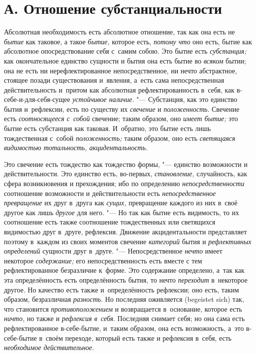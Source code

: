 \section[А. Отношение субстанциальности]{А. Отношение субстанциальности}

Абсолютная необходимость есть абсолютное
отношение, так как она есть не {\em бытие} как таковое,
а такое {\em бытие,} которое есть,
{\em потому что} оно есть, бытие как абсолютное
опосредствование себя с~самим собою. Это бытие есть
{\em субстанция;} как окончательное единство сущности и
бытия она есть бытие во {\em всяком} бытии; она не есть
ни нерефлектированное непосредственное, ни нечто абстрактное, стоящее
позади существования и~явления, а~есть сама непосредственная
действительность и~притом как абсолютная рефлектированность в~себя, как
в-себе-и-для-себя-сущее {\em устойчивое наличие}. "---
Субстанция, как это единство бытия и~рефлексии, есть по существу их
{\em свечение} и {\em положенность}. Свечение есть
{\em соотносящееся с~собой} свечение; таким образом,
оно {\em имеет бытие;} это бытие есть субстанция как
таковая. И~обратно, это бытие есть лишь тождественная с~собой
{\em положенность;} таким образом, оно есть
{\em светящаяся видимостью тотальность, акцидентальность.}

Это свечение есть тождество как тождество формы, "--- единство возможности и
действительности. Это единство есть, во-первых,
{\em становление,} случайность, как сфера возникновения
и прехождения; ибо по определению
{\em непосредственности} соотношение возможности и
действительности есть {\em непосредственное
превращение} их друг в~друга как {\em сущих,}
превращение каждого из них в~своё другое как лишь
{\em другое} для него. "--- Но так как бытие есть
видимость, то их соотношение есть также соотношение тождественных или
светящихся видимостью друг в~друге, рефлексия. Движение акцидентальности
представляет поэтому в~каждом из своих моментов свечение {\em категорий}
бытия и {\em рефлективных определений} сущности друг в~друге. "---
Непосредственное {\em нечто} имеет некоторое
{\em содержание;} его непосредственность есть вместе с
тем рефлектированное безразличие к~форме. Это содержание определено, а~так
как эта определённость есть определённость бытия, то нечто
{\em переходит} в~некоторое другое. Но качество есть
также и~определённость рефлексии; оно есть, таким образом, безразличная
{\em разность}. Но последняя оживляется (begeistet sich)
так, что становится {\em противоположением} и
возвращается в~основание, которое есть {\em ничто,} но
также и {\em рефлексия в~себя}. Последняя снимает себя;
но она сама есть рефлектированное в-себе-бытие, и~таким образом, она есть
возможность, а~это в-себе-бытие в~своём переходе, который есть также и
рефлексия в~себя, есть {\em необходимое действительное}.

